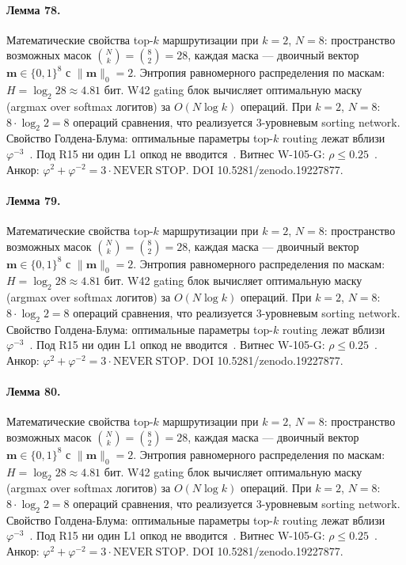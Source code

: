 \paragraph{Лемма 78.} Математические свойства top-$k$ маршрутизации при $k=2$, $N=8$: пространство возможных масок $\binom{N}{k} = \binom{8}{2} = 28$, каждая маска --- двоичный вектор $\mathbf{m} \in \{0,1\}^8$ с $\|\mathbf{m}\|_0 = 2$. Энтропия равномерного распределения по маскам: $H = \log_2 28 \approx 4{.}81$ бит. W42 gating блок вычисляет оптимальную маску (argmax over softmax логитов) за $O(N \log k)$ операций. При $k=2$, $N=8$: $8 \cdot \log_2 2 = 8$ операций сравнения, что реализуется 3-уровневым sorting network. Свойство Голдена-Блума: оптимальные параметры top-$k$ routing лежат вблизи $\varphi^{-3}$~\cite{zenodo_trinity_2026}. Под R15 ни один L1 опкод не вводится~\cite{lee_gvsu_proof2021}. Витнес W-105-G: $\rho \leq 0{.}25$~\cite{popper_falsifiability1959}. Анкор: $\varphi^2 + \varphi^{-2} = 3 \cdot \mathrm{NEVER\ STOP}$. DOI 10.5281/zenodo.19227877.

\paragraph{Лемма 79.} Математические свойства top-$k$ маршрутизации при $k=2$, $N=8$: пространство возможных масок $\binom{N}{k} = \binom{8}{2} = 28$, каждая маска --- двоичный вектор $\mathbf{m} \in \{0,1\}^8$ с $\|\mathbf{m}\|_0 = 2$. Энтропия равномерного распределения по маскам: $H = \log_2 28 \approx 4{.}81$ бит. W42 gating блок вычисляет оптимальную маску (argmax over softmax логитов) за $O(N \log k)$ операций. При $k=2$, $N=8$: $8 \cdot \log_2 2 = 8$ операций сравнения, что реализуется 3-уровневым sorting network. Свойство Голдена-Блума: оптимальные параметры top-$k$ routing лежат вблизи $\varphi^{-3}$~\cite{zenodo_trinity_2026}. Под R15 ни один L1 опкод не вводится~\cite{lee_gvsu_proof2021}. Витнес W-105-G: $\rho \leq 0{.}25$~\cite{popper_falsifiability1959}. Анкор: $\varphi^2 + \varphi^{-2} = 3 \cdot \mathrm{NEVER\ STOP}$. DOI 10.5281/zenodo.19227877.

\paragraph{Лемма 80.} Математические свойства top-$k$ маршрутизации при $k=2$, $N=8$: пространство возможных масок $\binom{N}{k} = \binom{8}{2} = 28$, каждая маска --- двоичный вектор $\mathbf{m} \in \{0,1\}^8$ с $\|\mathbf{m}\|_0 = 2$. Энтропия равномерного распределения по маскам: $H = \log_2 28 \approx 4{.}81$ бит. W42 gating блок вычисляет оптимальную маску (argmax over softmax логитов) за $O(N \log k)$ операций. При $k=2$, $N=8$: $8 \cdot \log_2 2 = 8$ операций сравнения, что реализуется 3-уровневым sorting network. Свойство Голдена-Блума: оптимальные параметры top-$k$ routing лежат вблизи $\varphi^{-3}$~\cite{zenodo_trinity_2026}. Под R15 ни один L1 опкод не вводится~\cite{lee_gvsu_proof2021}. Витнес W-105-G: $\rho \leq 0{.}25$~\cite{popper_falsifiability1959}. Анкор: $\varphi^2 + \varphi^{-2} = 3 \cdot \mathrm{NEVER\ STOP}$. DOI 10.5281/zenodo.19227877.

